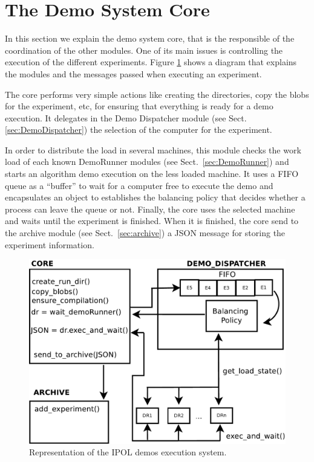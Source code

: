 \section{The Demo System Core}

In this section we explain the demo system core, that is the responsible of the coordination of the other modules. One of its main issues is controlling the execution of the different experiments. Figure \ref{fig:core_diagram} shows a diagram that explains the modules and the messages passed when executing an experiment.

The core performs very simple actions like creating the directories, copy the blobs for the experiment, etc, for ensuring that everything is ready for a demo execution. It delegates in the Demo Dispatcher module (see Sect.\ref{sec:DemoDispatcher}) the selection of the computer for the experiment. 

In order to distribute the load in several machines, this module checks the work load of each known DemoRunner modules (see Sect.~\ref{sec:DemoRunner}) and starts an algorithm demo execution on the less loaded machine. It uses a FIFO queue as a ``buffer'' to wait for a computer free to execute the demo and encapsulates an object to establishes the balancing policy that decides whether a process can leave the queue or not. Finally, the core uses the selected machine and waits until the experiment is finished. When it is finished, the core send to the archive module (see Sect.~\ref{sec:archive}) a JSON message for storing the experiment information.


\begin{figure}[!ht]
\centering
\includegraphics[width=0.7\columnwidth]{core/images/core_diagram.pdf}
\caption{Representation of the IPOL demos execution system.} 
\label{fig:core_diagram}
\end{figure}


